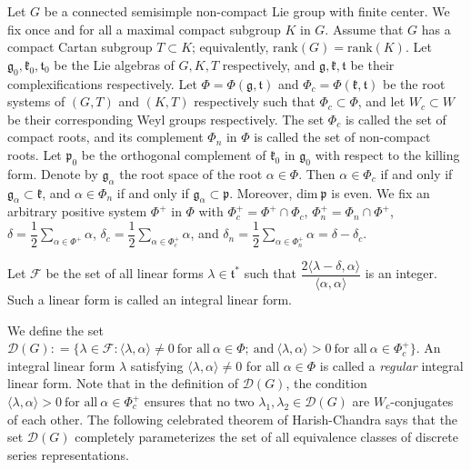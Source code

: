 \documentclass[11 pt]{amsart}
\theoremstyle{definition}
\numberwithin{equation}{section}
\begin{document}
Let $G$ be a connected semisimple non-compact Lie group with finite center. We fix once and for all a maximal compact subgroup $K$ in $G$. Assume that $G$ has a compact Cartan subgroup $T \subset K$; equivalently, $\text{rank} (G) = \text{rank} (K)$. Let $\mathfrak{g}_0, \mathfrak{k}_0, \mathfrak{t}_0$ be the Lie algebras of $G, K, T$ respectively, and $\mathfrak{g}, \mathfrak{k}, \mathfrak{t}$ be their complexifications respectively. Let $\Phi= \Phi(\mathfrak{g}, \mathfrak{t})$ and $\Phi_c= \Phi( \mathfrak{k} , \mathfrak{t})$ be the root systems of $(G, T)$ and $(K, T)$ respectively such that $\Phi_c \subset \Phi$, and  let $W_c \subset W$ be their corresponding Weyl groups respectively. The set $\Phi_c$ is called the set of compact roots, and its complement $\Phi_n$ in $\Phi$ is called the set of non-compact roots. Let $\mathfrak{p}_0$ be the orthogonal complement of $\mathfrak{k}_0$ in $\mathfrak{g}_0$ with respect to the killing form. Denote by $\mathfrak{g}_{\alpha}$ the root space of the root $\alpha \in \Phi$. Then $\alpha \in \Phi_c$ if and only if $\mathfrak{g}_{\alpha} \subset \mathfrak{k}$, and $\alpha \in \Phi_n$ if and only if  $\mathfrak{g}_{\alpha} \subset \mathfrak{p}$. Moreover, $\text{dim}\ \mathfrak{p}$ is even. We fix an arbitrary positive system $\Phi^+$ in $\Phi$ with $\Phi_c^+ = \Phi^+ \cap \Phi_c$, $ \Phi_n^+ = \Phi_n \cap \Phi^+$, $\delta= \dfrac{1}{2} \sum\limits_{\alpha \in \Phi^+} \alpha$, $\delta_c =  \dfrac{1}{2} \sum\limits_{\alpha \in \Phi_c^+} \alpha$, and $ \delta_n =  \dfrac{1}{2} \sum\limits_{\alpha \in \Phi_n^+} \alpha = \delta - \delta_c$.  


Let $\mathcal{F}$ be the set of all linear forms $\lambda \in \mathfrak{t}^*$ such that $\dfrac{2 \langle \lambda - \delta, \alpha \rangle }{\langle \alpha , \alpha \rangle}$ is an integer. Such a linear form is called an integral linear form.

\vspace{5pt}

\noindent\label{D^+(G)} We define the set \textit{$\mathcal{D}(G) : = \{ \lambda \in \mathcal{F} : \langle \lambda , \alpha \rangle \neq 0\ \text{for all}\ \alpha \in \Phi;\ \text{and}\ \langle \lambda , \alpha \rangle > 0\ \text{for all}\ \alpha \in \Phi_c^+ \}$}. An integral linear form $\lambda$ satisfying $\langle \lambda , \alpha \rangle \neq 0$ for all $\alpha \in \Phi$ is called a \textit{regular} integral linear form. Note that in the definition of $\mathcal{D}(G)$, the condition $\langle \lambda , \alpha \rangle > 0\ \text{for all}\ \alpha \in \Phi_c^+$ ensures that no two $\lambda_1, \lambda_2 \in \mathcal{D}(G)$ are $W_c$-conjugates of each other. The following celebrated theorem of Harish-Chandra says that the set $\mathcal{D}(G)$ completely parameterizes the set of all equivalence classes of discrete series representations.
\end{document}
